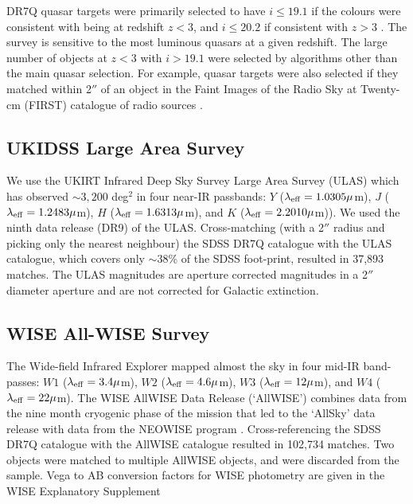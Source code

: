 DR7Q quasar targets were primarily selected to have $i \leq 19.1$ if the colours were consistent with being at redshift $z < 3$, and $i \leq 20.2$ if consistent with $z > 3$ \citep{richards02}. 
The survey is sensitive to the most luminous quasars at a given redshift. 
The large number of objects at $z < 3$ with $i > 19.1$ were selected by algorithms other than the main quasar selection. 
For example, quasar targets were also selected if they matched within 2$''$ of an object in the Faint Images of the Radio Sky at Twenty-cm (FIRST) catalogue of radio sources \citep{becker95}. 

\subsection{UKIDSS Large Area Survey}

We use the UKIRT Infrared Deep Sky Survey \citep[UKIDSS;][]{lawrence07} Large Area Survey (ULAS) which has observed $\sim 3,200$ deg$^2$ in four near-IR passbands: $Y$ ($\lambda_{\rm eff} = 1.0305\mu$m), $J$ ($\lambda_{\rm eff} = 1.2483\mu$m), $H$ ($\lambda_{\rm eff} = 1.6313\mu$m), and $K$ ($\lambda_{\rm eff} = 2.2010\mu$m)). 
We used the ninth data release (DR9) of the ULAS. 
Cross-matching (with a 2$''$ radius and picking only the nearest neighbour) the SDSS DR7Q catalogue with the ULAS catalogue, which covers only $\sim 38$\% of the SDSS foot-print, resulted in 37,893 matches. 
The ULAS magnitudes are aperture corrected magnitudes in a 2$''$ diameter aperture and are not corrected for Galactic extinction.

\subsection{WISE All-WISE Survey}

The Wide-field Infrared Explorer \citep[WISE;][]{wright10} mapped almost the sky in four mid-IR band-passes: $W1$ ($\lambda_{\rm eff} = 3.4\mu$m), $W2$ ($\lambda_{\rm eff} = 4.6\mu$m), $W3$ ($\lambda_{\rm eff} = 12\mu$m), and $W4$ ($\lambda_{\rm eff} = 22\mu$m). 
The WISE AllWISE Data Release (`AllWISE') combines data from the nine month cryogenic phase of the mission that led to the `AllSky' data release with data from the NEOWISE program \citep{mainzer11}. 
Cross-referencing the SDSS DR7Q catalogue with the AllWISE catalogue resulted in 102,734 matches. 
Two objects were matched to multiple AllWISE objects, and were discarded from the sample. 
Vega to AB conversion factors for WISE photometry are given in the WISE Explanatory Supplement \citep{cutri13}

